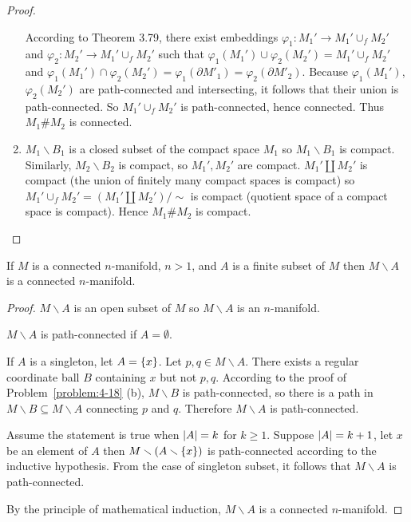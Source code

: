 \begin{proof}
\begin{enumerate}[label={(\alph*)}]
		      According to Theorem 3.79, there exist embeddings $\varphi_{1}: M_{1}' \to M_{1}' \cup_{f} M_{2}'$ and $\varphi_{2}: M_{2}' \to M_{1}' \cup_{f} M_{2}'$ such that $\varphi_{1}(M_{1}') \cup \varphi_{2}(M_{2}') = M_{1}' \cup_{f} M_{2}'$ and $\varphi_{1}(M_{1}') \cap \varphi_{2}(M_{2}') = \varphi_{1}(\partial M'_{1}) = \varphi_{2}(\partial M'_{2})$. Because $\varphi_{1}(M_{1}')$, $\varphi_{2}(M_{2}')$ are path-connected and intersecting, it follows that their union is path-connected. So $M_{1}' \cup_{f} M_{2}'$ is path-connected, hence connected. Thus $M_{1} \# M_{2}$ is connected.
		\item $M_{1}\smallsetminus B_{1}$ is a closed subset of the compact space $M_{1}$ so $M_{1}\smallsetminus B_{1}$ is compact. Similarly, $M_{2}\smallsetminus B_{2}$ is compact, so $M_{1}', M_{2}'$ are compact. $M_{1}' \amalg M_{2}'$ is compact (the union of finitely many compact spaces is compact) so $M_{1}' \cup_{f} M_{2}' = (M_{1}' \amalg M_{2}')/\sim$ is compact (quotient space of a compact space is compact). Hence $M_{1}\# M_{2}$ is compact.
	\end{enumerate}
\end{proof}

\begin{note}
	If $M$ is a connected $n$-manifold, $n > 1$, and $A$ is a finite subset of $M$ then $M\smallsetminus A$ is a connected $n$-manifold.
\end{note}

\begin{proof}
	$M\smallsetminus A$ is an open subset of $M$ so $M\smallsetminus A$ is an $n$-manifold.

	$M\smallsetminus A$ is path-connected if $A = \emptyset$.

	If $A$ is a singleton, let $A = \left\{{x}\right\}$. Let $p, q \in M\smallsetminus A$. There exists a regular coordinate ball $B$ containing $x$ but not $p, q$. According to the proof of Problem~\ref{problem:4-18} (b), $M\smallsetminus B$ is path-connected, so there is a path in $M\smallsetminus B \subseteq M\smallsetminus A$ connecting $p$ and $q$. Therefore $M\smallsetminus A$ is path-connected.

	Assume the statement is true when $\left\vert{A}\right\vert = k$ for $k \geq 1$. Suppose $\left\vert{A}\right\vert = k + 1$, let $x$ be an element of $A$ then $M \smallsetminus (A\smallsetminus \left\{{x}\right\})$ is path-connected according to the inductive hypothesis. From the case of singleton subset, it follows that $M\smallsetminus A$ is path-connected.

	By the principle of mathematical induction, $M\smallsetminus A$ is a connected $n$-manifold.
\end{proof}

